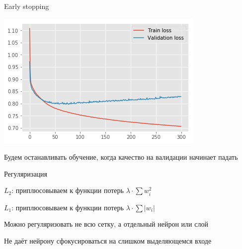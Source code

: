 \documentclass[notes,12pt, aspectratio=169]{beamer}
\newenvironment{wideitemize}{\itemize\addtolength{\itemsep}{10pt}}{\enditemize}
\begin{document}
\begin{frame}{Early stopping}
\begin{center}
\includegraphics[width=0.5\paperwidth]{early_stopping.png}
\end{center}
\begin{wideitemize}
\item Будем останавливать обучение, когда качество на валидации начинает падать
\end{wideitemize}
\end{frame}

\begin{frame}{Регуляризация}
\begin{wideitemize}
\item $L_2$: приплюсовываем к функции потерь $\lambda \cdot \sum w_i^2$

\item $L_1$: приплюсовываем к функции потерь $\lambda \cdot \sum |w_i|$

\item Можно регуляризовать не всю сетку, а отдельный нейрон или слой 

\item Не даёт нейрону сфокусироваться на слишком выделяющемся входе	
\end{wideitemize}
\end{frame}
\end{document}
